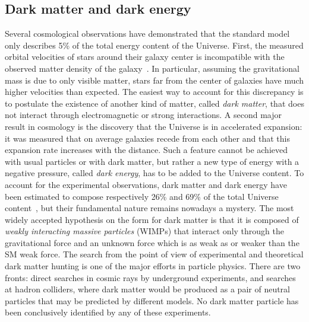 \subsection*{Dark matter and dark energy}

Several cosmological observations have demonstrated that the standard model only describes 5\% of the total energy content of the Universe.
First, the measured orbital velocities of stars around their galaxy center is incompatible with the observed matter density of the galaxy~\cite{DarkMatterRubin,Iocco:2015xga}.
In particular, assuming the gravitational mass is due to only visible matter, stars far from the center of galaxies have much higher velocities than expected. %
The easiest way to account for this discrepancy is to postulate the existence of another kind of matter, called \textit{dark matter}, that does not interact through electromagnetic or strong interactions.
A second major result in cosmology is the discovery that the Universe is in accelerated expansion: it was measured that on average galaxies recede from each other and that this expansion rate increases with the distance.
Such a feature cannot be achieved with usual particles or with dark matter, but rather a new type of energy with a negative pressure, called \textit{dark energy}, has to be added to the Universe content.
To account for the experimental observations, dark matter and dark energy have been estimated to compose respectively 26\% and 69\% of the total Universe content~\cite{Ade:2015xua}, but their fundamental nature remains nowadays a mystery.
The most widely accepted hypothesis on the form for dark matter is that it is composed of \textit{weakly interacting massive particles} (WIMPs) that interact only through the gravitational force and an unknown force which is as weak as or weaker than the SM weak force.
The search from the point of view of experimental and theoretical dark matter hunting is one of the major efforts in particle physics.
There are two fronts: direct searches in cosmic rays by underground experiments, and searches at hadron colliders, where dark matter would be produced as a pair of neutral particles that may be predicted by different models.
No dark matter particle has been conclusively identified by any of these experiments.

